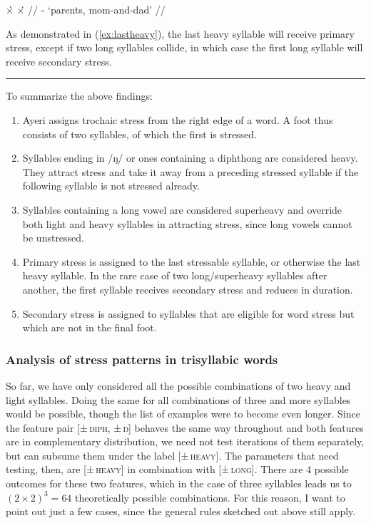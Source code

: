 \a\begingl
	\gla ×̀		{}	×́	{} //
	\glb {}	-			{`parents, mom-and-dad'} //
\endgl
\xe

As demonstrated in (\ref{ex:lastheavy}), the last heavy syllable will receive 
primary stress, except if two long syllables collide, in which case the first 
long syllable will receive secondary stress.

\plainbreak{1}

To summarize the above findings:

\begin{enumerate}\label{2sylsumm}
\item Ayeri assigns trochaic stress from the right edge of a word. A foot 
	thus consists of two syllables, of which the first is stressed.
\item Syllables ending in /ŋ/ or ones containing a diphthong are considered 
	heavy. They attract stress and take it away from a preceding stressed 
	syllable if the following syllable is not stressed already.
\item Syllables containing a long vowel are considered superheavy and override 
	both light and heavy syllables in attracting stress, since long vowels 
	cannot be unstressed.
\item Primary stress is assigned to the last stressable syllable, or otherwise 
	the last heavy syllable. In the rare case of two long/superheavy 
	syllables after another, the first syllable receives secondary stress 
	and reduces in duration.
\item Secondary stress is assigned to syllables that are eligible for word 
	stress but which are not in the final foot.
\end{enumerate}

\subsubsection{Analysis of stress patterns in trisyllabic words}

So far, we have only considered all the possible combinations of two heavy and 
light syllables. Doing the same for all combinations of three and more syllables 
would be possible, though the list of examples were to become even longer. 
Since the feature pair \textsc{[±\,diph, ±\,ŋ]} behaves the same way throughout 
and both features are in complementary distribution, we need not test 
iterations of them separately, but can subsume them under the label 
\textsc{[±\,heavy]}. The parameters that need testing, then, are 
\textsc{[±\,heavy]} in combination with \textsc{[±\,long]}. There are 4 
possible outcomes for these two features, which in the case of three syllables 
leads us to $(2 \times 2) ^ 3 = 64$ theoretically possible combinations. For 
this reason, I want to point out just a few cases, since the general rules 
sketched out above still apply. 

